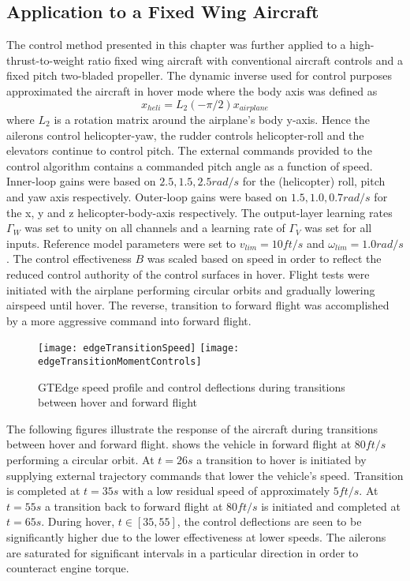 %
\subsection{Application to a Fixed Wing Aircraft}
The control method presented in this chapter was further applied to a
high-thrust-to-weight ratio fixed wing aircraft with conventional
aircraft controls and a fixed pitch two-bladed propeller. The
dynamic inverse used for control purposes approximated the aircraft
in hover mode where the body axis was defined as
\[
x_{heli} = L_2(-\pi/2)x_{airplane}
\]
where $L_2$ is a rotation matrix around the airplane's body y-axis.
Hence the ailerons control helicopter-yaw, the rudder controls
helicopter-roll and the elevators continue to control pitch. The
external commands provided to the control algorithm contains a
commanded pitch angle as a function of speed. Inner-loop gains were
based on $2.5, 1.5, 2.5 rad/s$ for the (helicopter) roll, pitch and
yaw axis respectively. Outer-loop gains were based on $1.5, 1.0, 0.7
rad/s$ for the x, y and z helicopter-body-axis respectively. The
output-layer learning rates $\Gamma_W$ was set to unity on all
channels and a learning rate of $\Gamma_V$ was set for all inputs.
Reference model parameters were set to $v_{lim} = 10 ft/s$ and
$\omega_{lim} = 1.0 rad/s$. The control effectiveness $B$ was scaled
based on speed in order to reflect the reduced control authority of
the control surfaces in hover. Flight tests were initiated with the
airplane performing circular orbits and gradually lowering airspeed
until hover. The reverse, transition to forward flight was
accomplished by a more aggressive command into forward flight.
\begin{figure}
  \begin{center}
  \texttt{[image: edgeTransitionSpeed]}
  \texttt{[image: edgeTransitionMomentControls]}
  \caption{GTEdge speed profile and control deflections during transitions between hover and forward flight}
  \label{f:gtedgeSpeedMomentControls}
  \end{center}
\end{figure}

The following figures illustrate the response of the aircraft during
transitions between hover and forward flight.
 shows the vehicle in forward
flight at $80 ft/s$ performing a circular orbit. At $t = 26s$ a
transition to hover is initiated by supplying external trajectory
commands that lower the vehicle's speed. Transition is completed at
$t = 35 s$ with a low residual speed of approximately $5 ft/s$. At
$t = 55 s$ a transition back to forward flight at $80 ft/s$ is
initiated and completed at $t = 65 s$. During hover, $t\in[35,55]$,
the control deflections are seen to be significantly higher due to
the lower effectiveness at lower speeds. The ailerons are saturated
for significant intervals in a particular direction in order to
counteract engine torque.


